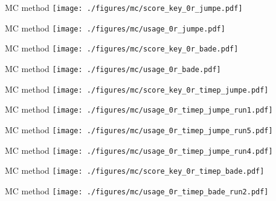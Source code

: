 \documentclass[hyperref={pdfpagelabels=false}]{beamer}
\begin{document}
\begin{frame}{MC method}
\texttt{[image: ./figures/mc/score\_key\_0r\_jumpe.pdf]}
\end{frame}

\begin{frame}{MC method}
\texttt{[image: ./figures/mc/usage\_0r\_jumpe.pdf]}
\end{frame}

\begin{frame}{MC method}
\texttt{[image: ./figures/mc/score\_key\_0r\_bade.pdf]}
\end{frame}

\begin{frame}{MC method}
\texttt{[image: ./figures/mc/usage\_0r\_bade.pdf]}
\end{frame}

\begin{frame}{MC method}
\texttt{[image: ./figures/mc/score\_key\_0r\_timep\_jumpe.pdf]}
\end{frame}

\begin{frame}{MC method}
\texttt{[image: ./figures/mc/usage\_0r\_timep\_jumpe\_run1.pdf]}
\end{frame}

\begin{frame}{MC method}
\texttt{[image: ./figures/mc/usage\_0r\_timep\_jumpe\_run5.pdf]}
\end{frame}

\begin{frame}{MC method}
\texttt{[image: ./figures/mc/usage\_0r\_timep\_jumpe\_run4.pdf]}
\end{frame}

\begin{frame}{MC method}
\texttt{[image: ./figures/mc/score\_key\_0r\_timep\_bade.pdf]}
\end{frame}

\begin{frame}{MC method}
\texttt{[image: ./figures/mc/usage\_0r\_timep\_bade\_run2.pdf]}
\end{frame}
\end{document}

